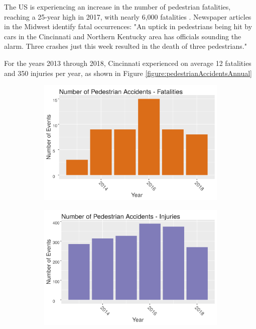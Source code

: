 \documentclass{llncs}
\begin{document}
The US is experiencing an increase in the number of pedestrian fatalities, reaching a 25-year high in 2017, with nearly 6,000 fatalities \cite{domonoske2018pedestrian}. Newspaper articles in the Midwest identify fatal occurrences: \cite{kelley2018police} "An uptick in pedestrians being hit by cars in the Cincinnati and Northern Kentucky area has officials sounding the alarm. Three crashes just this week resulted in the death of three pedestrians."

For the years 2013 through 2018, Cincinnati experienced on average 12 fatalities and 350 injuries per year, as shown in Figure \ref{figure:pedestrianAccidentsAnnual}

\FloatBarrier
\begin{figure}
 	\caption{Number of Pedestrian Accidents}
 	\label{figure:pedestrianAccidentsAnnual}
  		\begin{subfigure}[b]{0.5\textwidth}
    	\includegraphics[width = \textwidth, height = \textheight, keepaspectratio]{pedestrianAccidentNumFatalities.png}
    	\label{figure:pedestrianAccidentNumFatalities}
  	\end{subfigure}
  \begin{subfigure}[b]{0.5\textwidth}
    \includegraphics[width = \textwidth, height = \textheight, keepaspectratio]{pedestrianAccidentNumInjuries.png}
    \label{figure:pedestrianAccidentNumInjuries}
  \end{subfigure}
\end{figure}
\FloatBarrier
\end{document}
